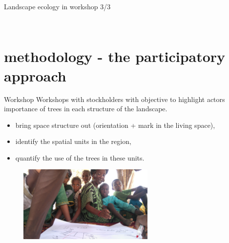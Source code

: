 \documentclass[newPxFont]{beamer}
\begin{document}
\begin{frame}[c]{Landscape ecology in workshop 3/3}
\vspace{-1cm}
\begin{figure}
  \\
\end{figure}
\end{frame}


\section{methodology - the participatory approach}
\begin{frame}[c]{Workshop}
\vspace{-1cm}
Workshops with stockholders with objective to highlight actors importance of trees
in each structure of the landscape.

\begin{itemize}
  \item bring space structure out (orientation + mark in the living space),
  \item identify the spatial units in the region,
  \item quantify the use of the trees in these units.
\end{itemize}
\begin{figure}
	\centering
	\includegraphics[width = 0.6\textwidth,angle=180]{img/DSC_1789}
\end{figure}
\end{frame}
\end{document}
